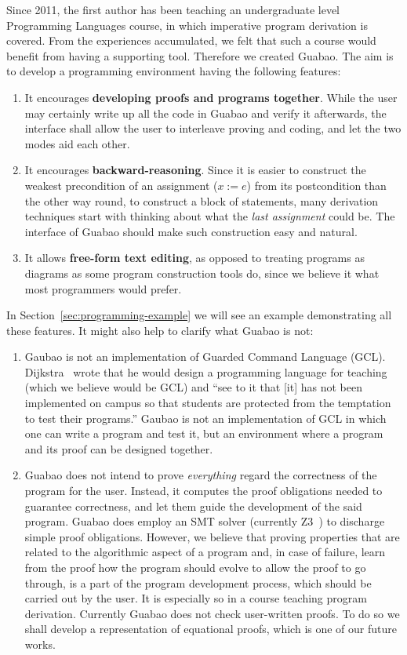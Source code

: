 \documentclass[runningheads]{llncs}
\newcommand{\Varid}[1]{\mathit{#1}}
\let\Varid\mathit
\begin{document}
Since 2011, the first author has been teaching an undergraduate level Programming Languages course, in which imperative program derivation is covered.
From the experiences accumulated, we felt that such a course would benefit from having a supporting tool.
Therefore we created Guabao.
The aim is to develop a programming environment having the following features:
\begin{enumerate}
\item It encourages {\bf developing proofs and programs together}.
While the user may certainly write up all the code in Guabao and verify it afterwards, the interface shall allow the user to interleave proving and coding, and let the two modes aid each other.
\item It encourages {\bf backward-reasoning}.
Since it is easier to construct the weakest precondition of an assignment (\ensuremath{\Varid{x}\mathbin{:=}\Varid{e}}) from its postcondition than the other way round,
to construct a block of statements, many derivation techniques start with thinking about what the \emph{last assignment} could be.
The interface of Guabao should make such construction easy and natural.
\item It allows {\bf free-form text editing}, as opposed to treating programs as diagrams as some program construction tools do, since we believe it what most programmers would prefer.
\end{enumerate}
In Section~\ref{sec:programming-example} we will see an example demonstrating all these features.
It might also help to clarify what Guabao is not:
\begin{enumerate}
\item Gaubao is not an implementation of Guarded Command Language (GCL).
Dijkstra~\cite{Dijkstra:98:Cruelty} wrote that he would
design a programming language for teaching (which we believe would be GCL) and ``see to it that [it] has not been implemented on campus so that students are protected from the temptation to test their programs.''
Gaubao is not an implementation of GCL in which one can write a program and test it, but an environment where a program and its proof can be designed together.
\item Guabao does not intend to prove \emph{everything} regard the correctness of the program for the user.
Instead, it computes the proof obligations needed to guarantee correctness, and let them guide the development of the said program.
Guabao does employ an SMT solver (currently Z3~\cite{MS:12:Z3}) to discharge simple proof obligations.
However, we believe that proving properties that are related to the algorithmic aspect of a program and, in case of failure, learn from the proof how the program should evolve to allow the proof to go through, is a part of the program development process, which should be carried out by the user.
It is especially so in a course teaching program derivation.
Currently Guabao does not check user-written proofs.
To do so we shall develop a representation of equational proofs, which is one of our future works.
\end{enumerate}
\end{document}
